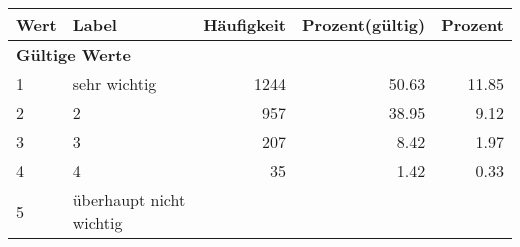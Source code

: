      \begin{longtable}{lXrrr}
     \toprule
     \textbf{Wert} & \textbf{Label} & \textbf{Häufigkeit} & \textbf{Prozent(gültig)} & \textbf{Prozent} \\
     \endhead
     \midrule
     \multicolumn{5}{l}{\textbf{Gültige Werte}}\\

     1 &
     \multicolumn{1}{X}{ sehr wichtig   } &


       \num{1244} &
       \num[round-mode=places,round-precision=2]{50,63} &
         \num[round-mode=places,round-precision=2]{11,85} \\

     2 &
     \multicolumn{1}{X}{ 2   } &


       \num{957} &
       \num[round-mode=places,round-precision=2]{38,95} &
         \num[round-mode=places,round-precision=2]{9,12} \\

     3 &
     \multicolumn{1}{X}{ 3   } &


       \num{207} &
       \num[round-mode=places,round-precision=2]{8,42} &
         \num[round-mode=places,round-precision=2]{1,97} \\

     4 &
     \multicolumn{1}{X}{ 4   } &


       \num{35} &
       \num[round-mode=places,round-precision=2]{1,42} &
         \num[round-mode=places,round-precision=2]{0,33} \\

     5 &
     \multicolumn{1}{X}{ überhaupt nicht wichtig   } &



\end{longtable}
